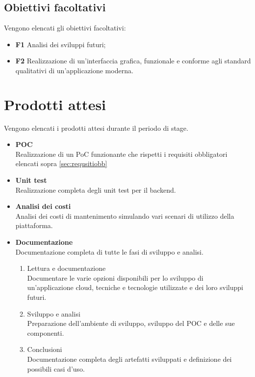 \subsection{Obiettivi facoltativi}
Vengono elencati gli obiettivi facoltativi:
\begin{itemize}
    \item \textbf{F1} Analisi dei sviluppi futuri;
    \item \textbf{F2} Realizzazione di un'interfaccia grafica, funzionale e conforme agli standard qualitativi di un'applicazione moderna.

\end{itemize}
\section{Prodotti attesi}
\label{sec:prodotti-attesi}
Vengono elencati i prodotti attesi durante il periodo di stage.
\begin{itemize}
    \item \textbf{POC} \\
    Realizzazione di un PoC funzionante che rispetti i requisiti obbligatori elencati sopra \ref{sec:requsitiobb}
    \item \textbf{Unit test} \\
    Realizzazione completa degli unit test per il backend.\\
    \item \textbf{Analisi dei costi} \\
    Analisi dei costi di mantenimento simulando vari scenari di utilizzo della piattaforma.\\
    \item \textbf{Documentazione} \\
    Documentazione completa di tutte le fasi di sviluppo e analisi.
    \begin{enumerate}
        \item Lettura e documentazione \\
         Documentare le varie opzioni disponibili per lo sviluppo di un'applicazione cloud, tecniche e tecnologie utilizzate e dei loro sviluppi futuri.
        \item Sviluppo e analisi \\
        Preparazione dell'ambiente di sviluppo, sviluppo del POC e delle sue componenti.
        \item Conclusioni \\
        Documentazione completa degli artefatti sviluppati e definizione dei possibili casi d'uso.
    \end{enumerate}
\end{itemize}
